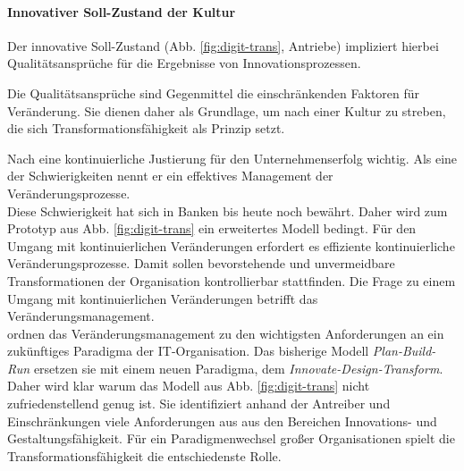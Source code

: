 \paragraph{Innovativer Soll-Zustand der Kultur}
Der innovative Soll-Zustand (Abb. \ref{fig:digit-trans}, Antriebe) impliziert hierbei Qualitätsansprüche für die Ergebnisse von Innovationsprozessen.

Die Qualitätsansprüche sind Gegenmittel die einschränkenden Faktoren für Veränderung.
Sie dienen daher als Grundlage, um nach einer Kultur zu streben, die sich Transformationsfähigkeit als Prinzip setzt.

Nach \citet[S.30]{Bussmann2006} eine kontinuierliche Justierung für den Unternehmenserfolg wichtig. Als eine der Schwierigkeiten nennt er ein effektives Management der Veränderungsprozesse.
\medskip
\\
Diese Schwierigkeit hat sich in Banken bis heute noch bewährt.
Daher wird zum Prototyp aus Abb. \ref{fig:digit-trans} ein erweitertes Modell bedingt. Für den Umgang mit kontinuierlichen Veränderungen erfordert es effiziente kontinuierliche Veränderungsprozesse.
Damit sollen bevorstehende und unvermeidbare Transformationen der Organisation kontrollierbar stattfinden.
Die Frage zu einem Umgang mit kontinuierlichen Veränderungen betrifft das Veränderungsmanagement.
\medskip
\\
\citet[S. 184f]{Koch2016} ordnen das Veränderungsmanagement zu den wichtigsten Anforderungen an ein zukünftiges Paradigma der IT-Organisation. Das bisherige Modell \emph{Plan-Build-Run} ersetzen sie mit einem neuen Paradigma, dem \emph{Innovate-Design-Transform}.
\medskip
\\
Daher wird klar warum das Modell aus Abb. \ref{fig:digit-trans} nicht zufriedenstellend genug ist. Sie identifiziert anhand der Antreiber und Einschränkungen viele Anforderungen aus \cite[Tab. 11.1]{Koch2016} aus den Bereichen Innovations- und Gestaltungsfähigkeit. Für ein Paradigmenwechsel großer Organisationen spielt die Transformationsfähigkeit die entschiedenste Rolle.

